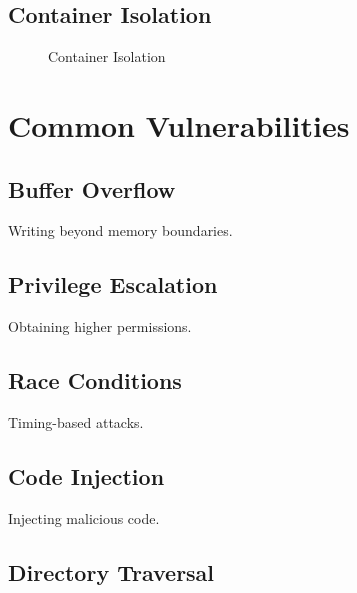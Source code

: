 \subsection{Container Isolation}

\begin{figure}[h]
\centering
{}
\caption{Container Isolation}
\end{figure}

\section{Common Vulnerabilities}

\subsection{Buffer Overflow}

Writing beyond memory boundaries.

\subsection{Privilege Escalation}

Obtaining higher permissions.

\subsection{Race Conditions}

Timing-based attacks.

\subsection{Code Injection}

Injecting malicious code.

\subsection{Directory Traversal}

